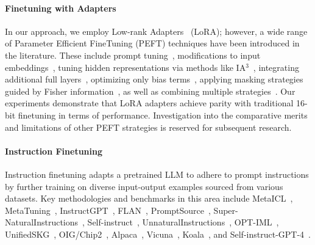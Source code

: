 \paragraph{Finetuning with Adapters} In our approach, we employ Low-rank Adapters~\citep{hu2021lora} (LoRA); however, a wide range of Parameter Efficient FineTuning (PEFT) techniques have been introduced in the literature. These include prompt tuning~\citep{qin2021learning,lester2021power,li2021prefix}, modifications to input embeddings~\citep{an2022input}, tuning hidden representations via methods like IA$^3$~\citep{liu2022few}, integrating additional full layers~\citep{houlsby2019parameter}, optimizing only bias terms~\citep{zaken2021bitfit}, applying masking strategies guided by Fisher information~\citep{sung2021training}, as well as combining multiple strategies~\citep{henderson2021compacter}. Our experiments demonstrate that LoRA adapters achieve parity with traditional 16-bit finetuning in terms of performance. Investigation into the comparative merits and limitations of other PEFT strategies is reserved for subsequent research.

\paragraph{Instruction Finetuning} Instruction finetuning adapts a pretrained LLM to adhere to prompt instructions by further training on diverse input-output examples sourced from various datasets. Key methodologies and benchmarks in this area include MetaICL~\citep{min2021metaicl}, MetaTuning~\citep{zhong2021adapting}, InstructGPT~\citep{ouyang2022training}, FLAN~\citep{wei2021finetuned,chung2022scaling}, PromptSource~\citep{bach2022promptsource}, Super-NaturalInstructions~\citep{wang2022super,sanh2021multitask}, Self-instruct~\citep{wang2022self}, UnnaturalInstructions~\citep{honovich2022unnatural}, OPT-IML~\citep{iyer2022opt}, UnifiedSKG~\citep{xie2022unifiedskg}, OIG/Chip2~\citep{laion2023}, Alpaca~\citep{alpaca}, Vicuna~\citep{vicuna2023}, Koala~\citep{koala_blogpost_2023}, and Self-instruct-GPT-4~\citep{peng2023instruction}.


